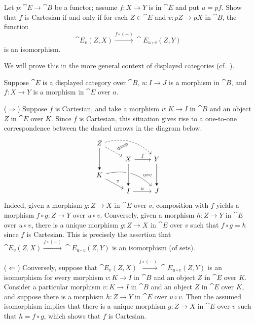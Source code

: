 \begin{exercise}
Let \(p : \cat{E} \to \cat{B}\) be a functor; assume \(f : X \to Y\) is in \(\cat E\) and put \(u = p f\).
Show that \(f\) is Cartesian if and only if for each \(Z \in \cat{E}\) and \(v : p Z \to pX\) in \(\cat{B}\), the function
\begin{equation*}
\cat{E}_v(Z, X) \xrightarrow{f \circ (-)} \cat{E}_{u \circ v}(Z, Y)
\end{equation*}
is an isomorphism.
\end{exercise}

We will prove this in the more general context of displayed categories (cf.~\cite{lmcs:5252}).

\begin{solution}
Suppose \(\cat{E}\) is a displayed category over \(\cat{B}\), \(u : I \to J\) is a morphism in \(\cat{B}\), and \(f : X \to Y\) is a morphism in \(\cat{E}\) over \(u\).

(\(\Longrightarrow\))
Suppose \(f\) is Cartesian, and take a morphism \(v : K \to I\) in \(\cat{B}\) and an object \(Z\) in \(\cat{E}\) over \(K\).
Since \(f\) is Cartesian, this situation gives rise to a one-to-one correspondence between the dashed arrows in the diagram below.
\begin{equation*}
\begin{tikzcd}[row sep=small]
Z \arrow[rd, dashed, ""{name=A}] \arrow[dd, -Triangle] \arrow[rrd, dashed, bend left, ""{name=B, below}] \\
& X \arrow[dd, -Triangle] \arrow[r, "f"] & Y \arrow[dd, -Triangle] \\
K \arrow[rd, "v"] \arrow[rrd, bend left, near end, "u \circ v"] \\
& I \arrow[r, "u"] & J
\arrow[from=uul, to=l, -Triangle, crossing over]
\arrow[from=A, to=B, Leftrightarrow]
\end{tikzcd}
\end{equation*}
Indeed, given a morphism \(g : Z \to X\) in \(\cat{E}\) over \(v\), composition with \(f\) yields a morphism \(f \circ g : Z \to Y\) over \(u \circ v\).
Conversely, given a morphism \(h :Z \to Y\) in \(\cat{E}\) over \(u \circ v\), there is a unique morphism \(g : Z \to X\) in \(\cat{E}\) over \(v\) such that \(f \circ g = h\) since \(f\) is Cartesian.
This is precisely the assertion that \(\cat{E}_v(Z, X) \xrightarrow{f \circ (-)} \cat{E}_{u \circ v}(Z, Y)\) is an isomorphism (of sets).

(\(\Longleftarrow\))
Conversely, suppose that \(\cat{E}_v(Z, X) \xrightarrow{f \circ (-)} \cat{E}_{u \circ v}(Z, Y)\) is an isomorphism for every morphism \(v : K \to I\) in \(\cat{B}\) and an object \(Z\) in \(\cat{E}\) over \(K\).
Consider a particular morphism \(v : K \to I\) in \(\cat{B}\) and an object \(Z\) in \(\cat{E}\) over \(K\), and suppose there is a morphism \(h : Z \to Y\) in \(\cat{E}\) over \(u \circ v\).
Then the assumed isomorphism implies that there is a unique morphism \(g : Z \to X\) in \(\cat{E}\) over \(v\) such that \(h = f \circ g\), which shows that \(f\) is Cartesian.
\end{solution}